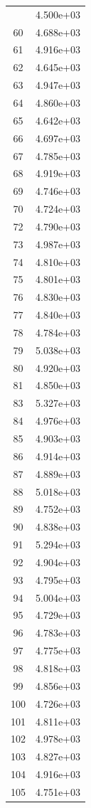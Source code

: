 \documentclass[12pt]{article}
\begin{document}
\begin{longtable}{@{}cc@{}}
\bottomrule
\endlastfoot
59 & 4.500e+03 \\
60 & 4.688e+03 \\
61 & 4.916e+03 \\
62 & 4.645e+03 \\
63 & 4.947e+03 \\
64 & 4.860e+03 \\
65 & 4.642e+03 \\
66 & 4.697e+03 \\
67 & 4.785e+03 \\
68 & 4.919e+03 \\
69 & 4.746e+03 \\
70 & 4.724e+03 \\
72 & 4.790e+03 \\
73 & 4.987e+03 \\
74 & 4.810e+03 \\
75 & 4.801e+03 \\
76 & 4.830e+03 \\
77 & 4.840e+03 \\
78 & 4.784e+03 \\
79 & 5.038e+03 \\
80 & 4.920e+03 \\
81 & 4.850e+03 \\
83 & 5.327e+03 \\
84 & 4.976e+03 \\
85 & 4.903e+03 \\
86 & 4.914e+03 \\
87 & 4.889e+03 \\
88 & 5.018e+03 \\
89 & 4.752e+03 \\
90 & 4.838e+03 \\
91 & 5.294e+03 \\
92 & 4.904e+03 \\
93 & 4.795e+03 \\
94 & 5.004e+03 \\
95 & 4.729e+03 \\
96 & 4.783e+03 \\
97 & 4.775e+03 \\
98 & 4.818e+03 \\
99 & 4.856e+03 \\
100 & 4.726e+03 \\
101 & 4.811e+03 \\
102 & 4.978e+03 \\
103 & 4.827e+03 \\
104 & 4.916e+03 \\
105 & 4.751e+03 \\

\end{longtable}
\end{document}
